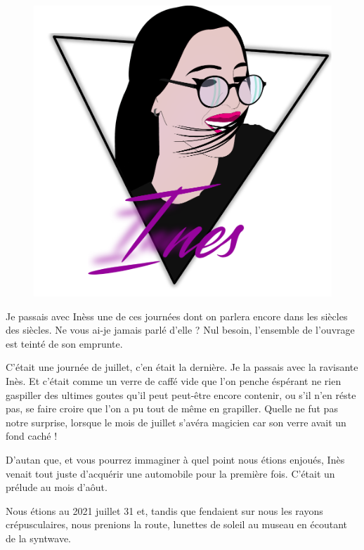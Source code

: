 \begin{figure}[h]
\centering
\includegraphics[width=\textwidth]{img/ines-syntwave.pdf}
\captionsetup{labelformat=empty}
\caption[Portrait syntwave d’Inèss]{}
\end{figure}

\begin{prose}
Je passais avec Inèss une de ces journées dont on parlera encore dans les siècles des siècles. Ne vous ai-je jamais parlé d’elle ? Nul besoin, l’ensemble de l’ouvrage est teinté de son emprunte.

C’était une journée de juillet, c’en était la dernière. Je la passais avec la ravisante Inès. Et c’était comme un verre de caffé vide que l’on penche éspérant ne rien gaspiller des ultimes goutes qu’il peut peut-être encore contenir, ou s’il n’en réste pas, se faire croire que l’on a pu tout de même en grapiller.
Quelle ne fut pas notre surprise, lorsque le mois de juillet s’avéra magicien car son verre avait un fond caché !

D’autan que, et vous pourrez immaginer à quel point nous étions enjoués, Inès venait tout juste d’acquérir une automobile pour la première fois. C’était un prélude au mois d’aôut.

Nous étions au 2021 juillet 31 et, tandis que fendaient sur nous les rayons crépusculaires, nous prenions la route, lunettes de soleil au museau en écoutant de la syntwave.
\end{prose}

